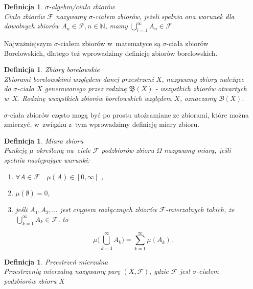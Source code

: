\documentclass[12pt,a4paper]{report}
\newtheorem{definition}[theorem]{Definicja}
\begin{document}
\begin{definition}{$\sigma$-algebra/ciało zbiorów\cite[Rozdział 8.1]{rudnicki2006}}\\
Ciało zbiorów $\mathcal{F}$ nazywamy $\sigma$-ciałem zbiorów, jeżeli spełnia ona warunek
dla dowolnych zbiorów $A_{n} \in \mathcal{F}, n \in \mathbb{N}$, mamy
$\bigcup\limits_{i=1}^{\infty} A_n \in \mathcal{F}$.
\end{definition}
Najważniejszym $\sigma$-ciałem zbiorów w~matematyce są $\sigma$-ciała zbiorów Borelowskich, dlatego też wprowadzimy definicję zbiorów borelowskich. 



\begin{definition}{Zbiory borelowskie \cite[w opraciu o rozdział 2]{billingsley1987}}\\
Zbiorami borelowskimi względem danej przestrzeni $X$, nazywamy zbiory należące do $\sigma$-ciała $X$ generowanego przez rodzinę $\mathfrak{B}(X)$ - wszystkich zbiorów otwartych w~$X$. Rodzinę wszystkich zbiorów borelowskich względem $X$, oznaczamy $\mathcal{B}(X)$.
\end{definition}

$\sigma$-ciała zbiorów często mogą być po prostu utożsamiane ze zbiorami, które można zmierzyć, w~związku z~tym wprowadzimy definicję miary zbioru.

\begin{definition}{Miara zbioru \cite[Rozdział 2.10] {billingsley1987}}\\
Funkcję $\mu$ określoną na~ciele $\mathcal{F}$ podzbiorów zbioru $\Omega$ nazywamy miarą, jeśli spełnia następujące warunki: 
\begin{enumerate}
\item $\forall{\textit{A} \in \mathcal{F}} \quad \mu(A) \in [0, \infty]$ ,
\item $\mu(\emptyset)=0$,
\item jeśli $A_1, A_2,...$ jest ciągiem rozłącznych zbiorów $\mathcal{F}$-mierzalnych takich, że $\bigcup\limits_{k=1}^{\infty} A_k \in \mathcal{F}$, to 

$$\mu\big(\bigcup\limits_{k=1}^{\infty} A_k\big)=\sum_{k=1}^{\infty} \mu(A_k).$$

\end{enumerate}
\end{definition}


\begin{definition}{Przestrzeń mierzalna \cite[Rozdział 2.10]{billingsley1987}}\\
Przestrzenią mierzalną nazywamy parę $(X, \mathcal{F})$, gdzie $\mathcal{F}$ jest $\sigma$-ciałem podzbiorów zbioru $X$
\end{definition}
\end{document}

